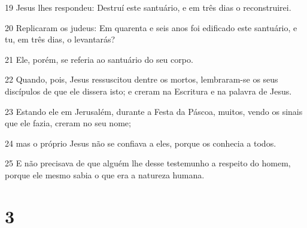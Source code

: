 \par 19 Jesus lhes respondeu: Destruí este santuário, e em três dias o reconstruirei.
\par 20 Replicaram os judeus: Em quarenta e seis anos foi edificado este santuário, e tu, em três dias, o levantarás?
\par 21 Ele, porém, se referia ao santuário do seu corpo.
\par 22 Quando, pois, Jesus ressuscitou dentre os mortos, lembraram-se os seus discípulos de que ele dissera isto; e creram na Escritura e na palavra de Jesus.
\par 23 Estando ele em Jerusalém, durante a Festa da Páscoa, muitos, vendo os sinais que ele fazia, creram no seu nome;
\par 24 mas o próprio Jesus não se confiava a eles, porque os conhecia a todos.
\par 25 E não precisava de que alguém lhe desse testemunho a respeito do homem, porque ele mesmo sabia o que era a natureza humana.

\chapter{3}

